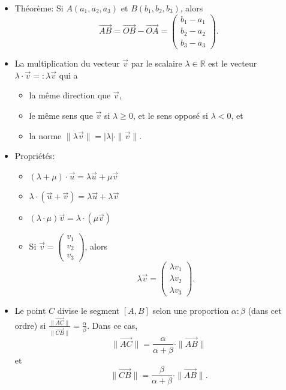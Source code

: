 \documentclass[12pt,a4paper]{article}
\newcommand{\vect}{\overrightarrow}
\begin{document}
\begin{itemize}[label=$\bullet$]
\item \textcolor{th!60!black}{Théorème}: Si $A(a_1,a_2,a_3)$ et $B(b_1,b_2,b_3)$, alors $$\vect{AB}=\vect{OB}-\vect{OA}=\begin{pmatrix}
b_1-a_1\\b_2-a_2\\b_3-a_3
\end{pmatrix}.$$

\item La \colorbox{def!40}{multiplication} du vecteur $\vect{v}$ par le \colorbox{def!40}{scalaire} $\lambda\in\mathbb{R}$ est le vecteur \\ $\lambda\cdot \vect{v}=:\lambda\vect{v}$ qui a
\begin{itemize}[label=$\circ$]
\item la même direction que $\vect{v}$,
\item le même sens que $\vect{v}$ si $\lambda\geq 0$, et le sens opposé si $\lambda <0$, et
\item la norme $\|\lambda \vect{v}\|=|\lambda|\cdot \|\vect{v}\|$.
\end{itemize}
\item \textcolor{th!60!black}{Propriétés:}
\begin{itemize}[label=$\circ$]
\item $(\lambda+\mu)\cdot \vect{u}=\lambda \vect{u}+\mu \vect{v}$
\item $\lambda\cdot(\vect{u}+\vect{v})=\lambda \vect{u}+\lambda \vect{v}$
\item $(\lambda\cdot\mu)\vect{v}=\lambda\cdot(\mu\vect{v})$
\item Si $\vect{v}=\begin{pmatrix}
v_1\\v_2\\v_3
\end{pmatrix}$, alors $$\lambda\vect{v}=\begin{pmatrix}
\lambda v_1\\\lambda v_2\\\lambda v_3
\end{pmatrix}.$$
\end{itemize}
\item Le point $C$ divise le segment $[A,B]$ selon une proportion $\alpha:\beta$ (dans cet ordre) si $\displaystyle\frac{\|\vect{AC}\|}{\|\vect{CB}\|}=\frac{\alpha}{\beta}$. Dans ce cas, $$\displaystyle\|\vect{AC}\|=\frac{\alpha}{\alpha+\beta}\cdot\|\vect{AB}\|$$ et $$\displaystyle\|\vect{CB}\|=\frac{\beta}{\alpha+\beta}\cdot\|\vect{AB}\|.$$
\end{itemize}
\end{document}
